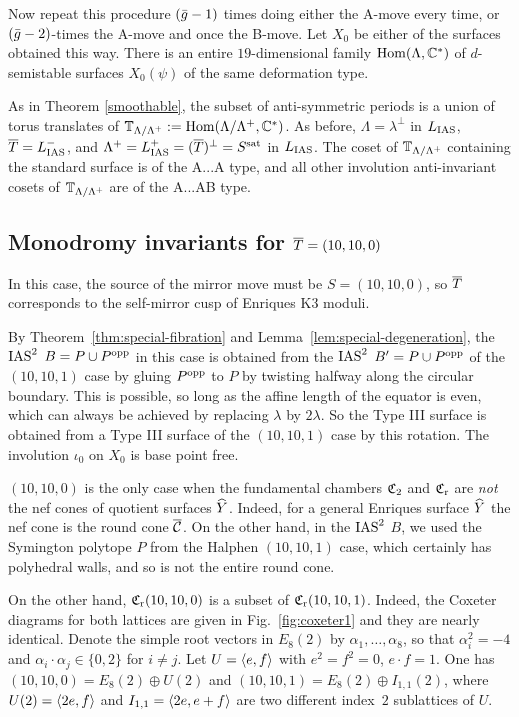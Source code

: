 \documentclass{amsart}
\begin{document}
Now repeat this procedure $(\bar g-1)$ times doing either the A-move
every time, or $(\bar g-2)$-times the A-move and once the B-move.
Let $X_0$ be either of the surfaces obtained this way. There is an
entire $19$-dimensional family $\operatorname{Hom}(\Lambda,{\mathbb C}^*)$ of $d$-semistable
surfaces $X_0(\psi)$ of the same deformation type.

As in Theorem \ref{smoothable}, 
the subset of anti-symmetric periods is a union of torus translates
of ${\mathbb T}_{\Lambda/\Lambda^+}:={\rm Hom}(\Lambda/\Lambda^+,{\mathbb C}^*)$. As before, $\Lambda=\lambda^\perp$ in
$L_{\rm IAS}$, ${\overline T} = L_{\rm IAS}^-$, and $\Lambda^+ = L_{\rm IAS}^+ = ({\overline T})^\perp=S^{\rm sat}$ in
$L_{\rm IAS}$. The coset of ${\mathbb T}_{\Lambda/\Lambda^+}$ containing the standard
surface is of the A...A type, and all other involution anti-invariant cosets
of ${\mathbb T}_{\Lambda/\Lambda^+}$ are of the A...AB type. 


\subsection{Monodromy invariants for ${\overline T}=(10,10,0)$}
\label{sec:models-enriques}
In this case, the source of the mirror move must be $S= (10,10,0)$, so
${\overline T}$ corresponds to the self-mirror cusp of Enriques K3 moduli.

By Theorem~\ref{thm:special-fibration} and
Lemma~\ref{lem:special-degeneration}, the $\operatorname{IAS}^2$ $B=P\cup P^{\rm opp}$ in
this case is obtained from the $\operatorname{IAS}^2$ $B'=P\cup P^{\rm opp}$ of the
$(10,10,1)$ case by gluing $P^{\rm opp}$ to $P$ by twisting 
halfway along the circular boundary. This is possible, so long as the affine length of
the equator is even, which can always be achieved by replacing
$\lambda$ by $2\lambda$. So the Type III surface is obtained from a
Type III surface of the $(10,10,1)$ case by this rotation. The
involution $\iota_0$ on $X_0$ is base point free. 

$(10,10,0)$ is the only case when the
fundamental chambers ${\mathfrak C}_2$ and ${\mathfrak C}_{\rm r}$ are
\emph{not} the nef cones of quotient surfaces ${\widehat Y}$. Indeed, for a
general Enriques surface ${\widehat Y}$ the nef cone is the round cone
$\overline{{\mathcal C}}$. On the other hand, in the $\operatorname{IAS}^2$ $B$, we used the
Symington polytope $P$ from the Halphen $(10,10,1)$ case,
which certainly has polyhedral walls, and so is not the entire round cone.

On the other hand, ${\mathfrak C}_{\rm r}(10,10,0)$ is a subset of ${\mathfrak C}_{\rm r}(10,10,1)$.
Indeed, the Coxeter
diagrams for both lattices are given in Fig.~\ref{fig:coxeter1} and
they are nearly identical. 
Denote the simple root vectors in $E_8(2)$ by
$\alpha_1,\dotsc,\alpha_8$, so that $\alpha_i^2=-4$ and
$\alpha_i\cdot \alpha_j\in\{0,2\}$ for $i\ne j$. Let $U=\langle e,f\rangle$ with
$e^2=f^2=0$, $e\cdot f=1$. One has $(10,10,0)=E_8(2)\oplus U(2)$ and
$(10,10,1) = E_8(2)\oplus I_{1,1}(2)$, where $U(2)=\langle 2e,f\rangle$ and
$I_{1,1} = \langle 2e, e+f\rangle$ are two different index~$2$ sublattices of
$U$.
\end{document}
